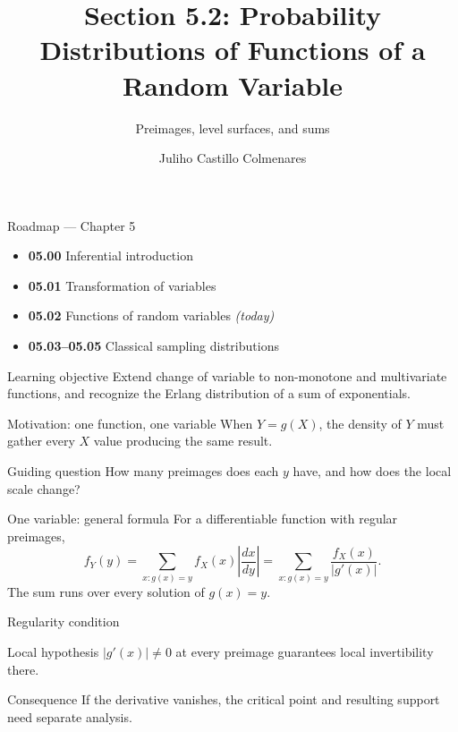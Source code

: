 \documentclass[10pt,aspectratio=169]{beamer}
\title[Distributions of Functions]{Section 5.2: Probability Distributions of Functions of a Random Variable}
\subtitle{Preimages, level surfaces, and sums}
\author[J. Castillo Colmenares]{Juliho Castillo Colmenares}
\institute{Tecnológico de Monterrey}
\date{}
\begin{document}
\begin{frame}[plain]\vspace{-0.8cm}\titlepage\end{frame}

\begin{frame}{Roadmap --- Chapter 5}
  \footnotesize
  \begin{itemize}\itemsep=0.08cm
    \item \textbf{05.00} Inferential introduction
    \item \textbf{05.01} Transformation of variables
    \item \textbf{05.02} Functions of random variables \emph{(today)}
    \item \textbf{05.03--05.05} Classical sampling distributions
  \end{itemize}
  \begin{block}{Learning objective}
    Extend change of variable to non-monotone and multivariate functions, and
    recognize the Erlang distribution of a sum of exponentials.
  \end{block}
\end{frame}

\begin{frame}{Motivation: one function, one variable}
  \footnotesize
  When $Y=g(X)$, the density of $Y$ must gather every $X$ value producing the
  same result.
  \begin{alertblock}{Guiding question}
    How many preimages does each $y$ have, and how does the local scale change?
  \end{alertblock}
\end{frame}

\begin{frame}{One variable: general formula}
  \footnotesize
  For a differentiable function with regular preimages,
  \[
    f_Y(y)=\sum_{x:g(x)=y}f_X(x)\left|\frac{dx}{dy}\right|
    =\sum_{x:g(x)=y}\frac{f_X(x)}{|g'(x)|}.
  \]
  The sum runs over every solution of $g(x)=y$.
\end{frame}

\begin{frame}{Regularity condition}
  \footnotesize
  \begin{block}{Local hypothesis}
    $|g'(x)|\neq0$ at every preimage guarantees local invertibility there.
  \end{block}
  \begin{exampleblock}{Consequence}
    If the derivative vanishes, the critical point and resulting support need
    separate analysis.
  \end{exampleblock}
\end{frame}
\end{document}
